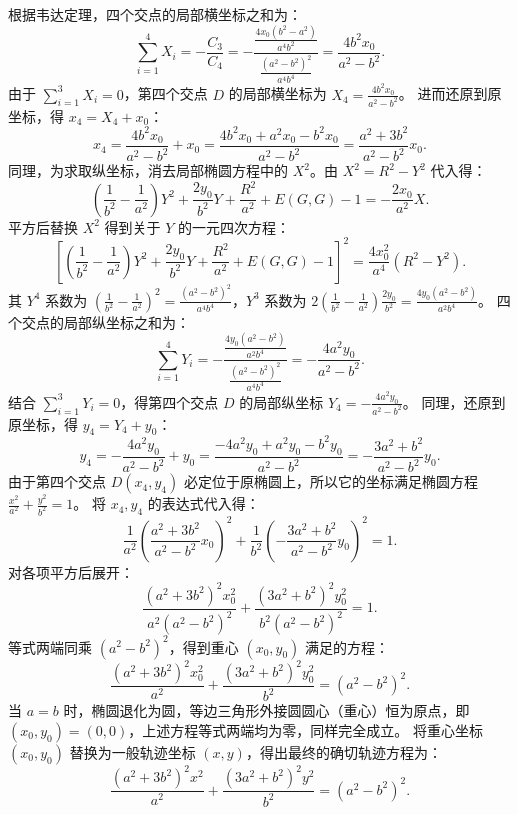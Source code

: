 \begin{solution}
根据韦达定理，四个交点的局部横坐标之和为：
\[ \sum_{i=1}^4 X_i = -\frac{C_3}{C_4} = - \frac{\frac{4x_0 (b^2 - a^2)}{a^4 b^2}}{\frac{(a^2 - b^2)^2}{a^4 b^4}} = \frac{4b^2 x_0}{a^2 - b^2}. \]
由于 $\sum_{i=1}^3 X_i = 0$，第四个交点 $D$ 的局部横坐标为 $X_4 = \frac{4b^2 x_0}{a^2 - b^2}$。
进而还原到原坐标，得 $x_4 = X_4 + x_0$：
\[ x_4 = \frac{4b^2 x_0}{a^2 - b^2} + x_0 = \frac{4b^2 x_0 + a^2 x_0 - b^2 x_0}{a^2 - b^2} = \frac{a^2 + 3b^2}{a^2 - b^2} x_0. \]
同理，为求取纵坐标，消去局部椭圆方程中的 $X^2$。由 $X^2 = R^2 - Y^2$ 代入得：
\[ \left( \frac{1}{b^2} - \frac{1}{a^2} \right) Y^2 + \frac{2y_0}{b^2} Y + \frac{R^2}{a^2} + E(G,G) - 1 = - \frac{2x_0}{a^2} X. \]
平方后替换 $X^2$ 得到关于 $Y$ 的一元四次方程：
\[ \left[ \left( \frac{1}{b^2} - \frac{1}{a^2} \right) Y^2 + \frac{2y_0}{b^2} Y + \frac{R^2}{a^2} + E(G,G) - 1 \right]^2 = \frac{4x_0^2}{a^4} (R^2 - Y^2). \]
其 $Y^4$ 系数为 $\left( \frac{1}{b^2} - \frac{1}{a^2} \right)^2 = \frac{(a^2 - b^2)^2}{a^4 b^4}$，$Y^3$ 系数为 $2 \left( \frac{1}{b^2} - \frac{1}{a^2} \right) \frac{2y_0}{b^2} = \frac{4y_0 (a^2 - b^2)}{a^2 b^4}$。
四个交点的局部纵坐标之和为：
\[ \sum_{i=1}^4 Y_i = -\frac{\frac{4y_0 (a^2 - b^2)}{a^2 b^4}}{\frac{(a^2 - b^2)^2}{a^4 b^4}} = -\frac{4a^2 y_0}{a^2 - b^2}. \]
结合 $\sum_{i=1}^3 Y_i = 0$，得第四个交点 $D$ 的局部纵坐标 $Y_4 = -\frac{4a^2 y_0}{a^2 - b^2}$。
同理，还原到原坐标，得 $y_4 = Y_4 + y_0$：
\[ y_4 = -\frac{4a^2 y_0}{a^2 - b^2} + y_0 = \frac{-4a^2 y_0 + a^2 y_0 - b^2 y_0}{a^2 - b^2} = - \frac{3a^2 + b^2}{a^2 - b^2} y_0. \]
由于第四个交点 $D(x_4, y_4)$ 必定位于原椭圆上，所以它的坐标满足椭圆方程 $\frac{x^2}{a^2} + \frac{y^2}{b^2} = 1$。
将 $x_4, y_4$ 的表达式代入得：
\[ \frac{1}{a^2} \left( \frac{a^2 + 3b^2}{a^2 - b^2} x_0 \right)^2 + \frac{1}{b^2} \left( - \frac{3a^2 + b^2}{a^2 - b^2} y_0 \right)^2 = 1. \]
对各项平方后展开：
\[ \frac{(a^2 + 3b^2)^2 x_0^2}{a^2 (a^2 - b^2)^2} + \frac{(3a^2 + b^2)^2 y_0^2}{b^2 (a^2 - b^2)^2} = 1. \]
等式两端同乘 $(a^2 - b^2)^2$，得到重心 $(x_0, y_0)$ 满足的方程：
\[ \frac{(a^2 + 3b^2)^2 x_0^2}{a^2} + \frac{(3a^2 + b^2)^2 y_0^2}{b^2} = (a^2 - b^2)^2. \]
当 $a = b$ 时，椭圆退化为圆，等边三角形外接圆圆心（重心）恒为原点，即 $(x_0, y_0) = (0, 0)$，上述方程等式两端均为零，同样完全成立。
将重心坐标 $(x_0, y_0)$ 替换为一般轨迹坐标 $(x, y)$，得出最终的确切轨迹方程为：
\[ \frac{(a^2 + 3b^2)^2 x^2}{a^2} + \frac{(3a^2 + b^2)^2 y^2}{b^2} = (a^2 - b^2)^2. \]
\end{solution}


